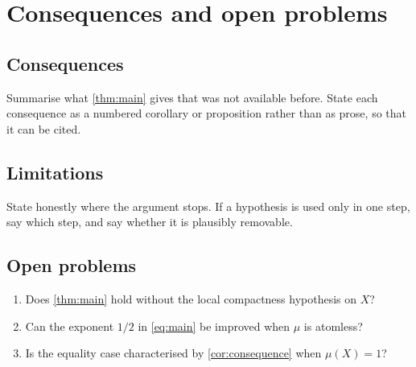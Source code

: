 
\section{Consequences and open problems}
\label{sec:conclusion}

\subsection{Consequences}

Summarise what \cref{thm:main} gives that was not available before.
State each consequence as a numbered corollary or proposition rather
than as prose, so that it can be cited.

\subsection{Limitations}

State honestly where the argument stops. If a hypothesis is used only
in one step, say which step, and say whether it is plausibly removable.

\subsection{Open problems}

\begin{enumerate}
  \item Does \cref{thm:main} hold without the local compactness
        hypothesis on $X$?
  \item Can the exponent $1/2$ in \cref{eq:main} be improved when
        $\mu$ is atomless?
  \item Is the equality case characterised by \cref{cor:consequence}
        when $\mu(X) = 1$?
\end{enumerate}
